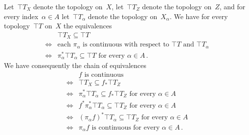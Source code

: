 Let~$\top{T}_X$ denote the topology on~$X$, let~$\top{T}_Z$ denote the topology on~$Z$, and for every index~$α ∈ A$ let~$\top{T}_α$ denote the topology on~$X_α$.
We have for every topology~$\top{T}$ on~$X$ the equivalences
\begin{align*}
	{}&
	\top{T}_X ⊆ \top{T}
	\\
	\iff{}&
	\text{each~$π_α$ is continuous with respect to~$\top{T}$ and~$\top{T}_α$}
	\\
	\iff{}&
	\text{$π_α^* \top{T}_α ⊆ \top{T}$ for every~$α ∈ A$} \,.
\end{align*}
We have consequently the chain of equivalences
\begin{align*}
	{}&
	\text{$f$ is continuous} \\
	\iff{}&
	\top{T}_X ⊆ f_* \top{T}_Z \\
	\iff{}&
	\text{$π_α^* \top{T}_α ⊆ f_* \top{T}_Z$ for every~$α ∈ A$} \\
	\iff{}&
	\text{$f^* π_α^* \top{T}_α ⊆ \top{T}_Z$ for every~$α ∈ A$} \\
	\iff{}&
	\text{$(π_α f)^* \top{T}_α ⊆ \top{T}_Z$ for every~$α ∈ A$} \\
	\iff{}&
	\text{$π_α f$ is continuous for every~$α ∈ A$} \,.
\end{align*}
